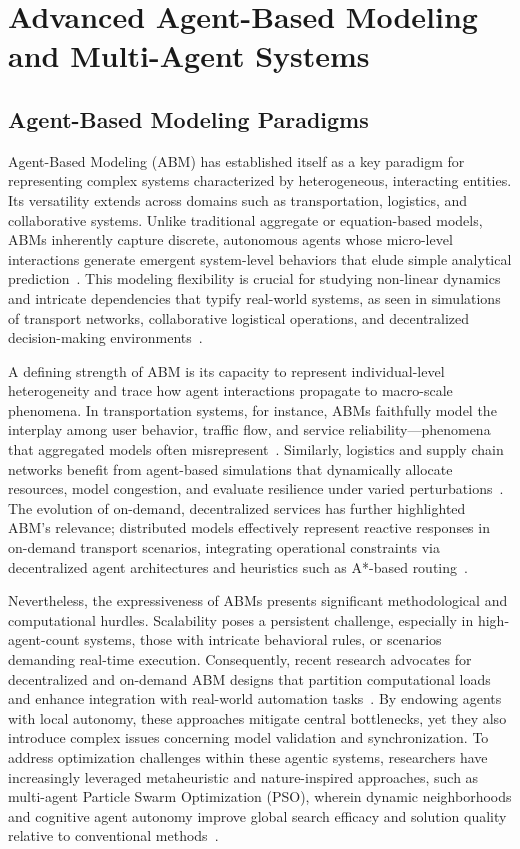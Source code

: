 \section{Advanced Agent-Based Modeling and Multi-Agent Systems}

\subsection{Agent-Based Modeling Paradigms}

Agent-Based Modeling (ABM) has established itself as a key paradigm for representing complex systems characterized by heterogeneous, interacting entities. Its versatility extends across domains such as transportation, logistics, and collaborative systems. Unlike traditional aggregate or equation-based models, ABMs inherently capture discrete, autonomous agents whose micro-level interactions generate emergent system-level behaviors that elude simple analytical prediction~\cite{ref114}\cite{ref115}. This modeling flexibility is crucial for studying non-linear dynamics and intricate dependencies that typify real-world systems, as seen in simulations of transport networks, collaborative logistical operations, and decentralized decision-making environments~\cite{ref114}\cite{ref115}.

A defining strength of ABM is its capacity to represent individual-level heterogeneity and trace how agent interactions propagate to macro-scale phenomena. In transportation systems, for instance, ABMs faithfully model the interplay among user behavior, traffic flow, and service reliability---phenomena that aggregated models often misrepresent~\cite{ref114}. Similarly, logistics and supply chain networks benefit from agent-based simulations that dynamically allocate resources, model congestion, and evaluate resilience under varied perturbations~\cite{ref115}. The evolution of on-demand, decentralized services has further highlighted ABM’s relevance; distributed models effectively represent reactive responses in on-demand transport scenarios, integrating operational constraints via decentralized agent architectures and heuristics such as A*-based routing~\cite{ref114}\cite{ref115}.

Nevertheless, the expressiveness of ABMs presents significant methodological and computational hurdles. Scalability poses a persistent challenge, especially in high-agent-count systems, those with intricate behavioral rules, or scenarios demanding real-time execution. Consequently, recent research advocates for decentralized and on-demand ABM designs that partition computational loads and enhance integration with real-world automation tasks~\cite{ref114}\cite{ref115}. By endowing agents with local autonomy, these approaches mitigate central bottlenecks, yet they also introduce complex issues concerning model validation and synchronization. To address optimization challenges within these agentic systems, researchers have increasingly leveraged metaheuristic and nature-inspired approaches, such as multi-agent Particle Swarm Optimization (PSO), wherein dynamic neighborhoods and cognitive agent autonomy improve global search efficacy and solution quality relative to conventional methods~\cite{ref101}.

